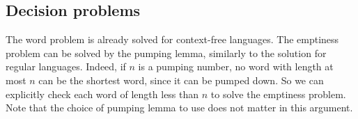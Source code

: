 \subsection{Decision problems}
The word problem is already solved for context-free languages.
The emptiness problem can be solved by the pumping lemma, similarly to the solution for regular languages.
Indeed, if \( n \) is a pumping number, no word with length at most \( n \) can be the shortest word, since it can be pumped down.
So we can explicitly check each word of length less than \( n \) to solve the emptiness problem.
Note that the choice of pumping lemma to use does not matter in this argument.
